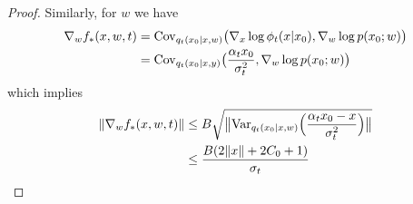 \documentclass[11pt]{article}
\numberwithin{equation}{section}
\begin{document}
\begin{proof}
    Similarly, for $w$ we have
    \begin{equation}
        \begin{aligned}
            \nabla_wf_*(x,w,t)
            &=\mathrm{Cov}_{q_t(x_0|x,w)}\big(\nabla_x\log\phi_t(x|x_0),\nabla_w\log p(x_0;w)\big) \\
            &=\mathrm{Cov}_{q_t(x_0|x,y)}\big(\frac{\alpha_tx_0}{\sigma_t^2},\nabla_w\log p(x_0;w)\big) \\
        \end{aligned}
    \end{equation}
    which implies 
    \begin{equation}\label{eq:lip_w_large}
        \begin{aligned}
            \|\nabla_wf_*(x,w,t)\|
            &\leq B\sqrt{\big\|\mathrm{Var}_{q_t(x_0|x,w)}\Big(\frac{\alpha_tx_0-x}{\sigma_t^2}\Big)\big\|} \\
            &\leq \frac{B(2\|x\|+2C_0+1)}{\sigma_t}
        \end{aligned}
    \end{equation}


\end{proof}
\end{document}
